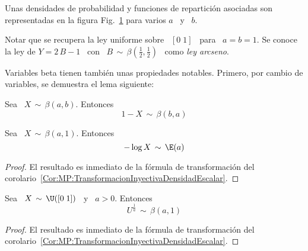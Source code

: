 Unas  densidades de  probabilidad  y funciones  de  repartici\'on asociadas  son
representadas en la figura Fig.~\ref{Fig:MP:Beta} para varios $a$ \ y \ $b$.
%
\begin{figure}[h!]
\begin{center}  \end{center}
%
\label{Fig:MP:Beta}
\end{figure}

Notar que  se recupera la  ley uniforme sobre  \ $[0 \;  1]$ \ para  \ $a =  b =
1$. Se  conoce la ley de $  Y = 2 \,  B - 1$ \  con \ $B \,  \sim \, \beta\left(
  \frac12 , \frac12 \right)$ \ como {\em ley arcseno}.

Variables beta  tienen tambi\'en unas propiedades notables.  Primero, por cambio
de variables, se demuestra el lema siguiente:
%
\begin{lema}[Reflexividad]
\label{Lem:MP:ReflexividadBeta}
%
  Sea \ $X \, \sim \, \beta(a,b)$. Entonces
  \[
  1-X \, \sim \, \beta(b,a)
  \]
\end{lema}


\begin{lema}
\label{Lem:MP:VinculoBetaExponencial}
%
  Sea  \   $X  \,  \sim  \,   \beta(a,1)$. Entonces
  \[
  - \log X \, \sim \, \E(a)
  \]
\end{lema}
%
\begin{proof}
  El   resultado  es   inmediato  de   la  f\'ormula   de   transformaci\'on  del
  corolario~\ref{Cor:MP:TransformacionInyectivaDensidadEscalar}.
\end{proof}


\begin{lema}
\label{Lem:MP:VinculoBetaUniforme}
%
  Sea  \   $X  \,  \sim  \,   \U([0 \; 1])$ \ y \ $a > 0$. Entonces
  \[
  U^{\frac{1}{a}} \, \sim \, \beta(a,1)
  \]
\end{lema}
%
\begin{proof}
  El   resultado  es   inmediato  de   la  f\'ormula   de   transformaci\'on  del
  corolario~\ref{Cor:MP:TransformacionInyectivaDensidadEscalar}.
\end{proof}

